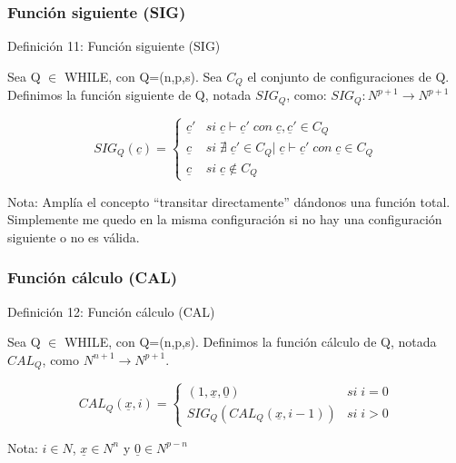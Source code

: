 \documentclass[xcolor=table]{beamer}
\begin{document}
\begin{frame}[fragile]\frametitle{ Función siguiente (SIG)  } \footnotesize  

\begin{block}{Definición 11: Función siguiente (SIG)}
\end{block}

Sea Q $\in$ WHILE, con Q=(n,p,s). Sea $C_Q$ el conjunto de configuraciones de Q. Definimos la función siguiente de Q, notada $SIG_Q$, como: $SIG_Q: N^{p+1} \rightarrow N^{p+1}$


   \scriptsize\begin{equation*} SIG_Q(\underline{c}) = 
            \begin{cases} 
                    \underline{c}'      & si\; \underline{c} \vdash  \underline{c}' \;con \;\underline{c}, \underline{c}' \in C_Q\\
                     \underline{c}      & si\; \nexists \; \underline{c}' \in C_Q |\; \underline{c} \vdash  \underline{c}' \;con \;\underline{c} \in C_Q \\
                     \underline{c}      & si\; \underline{c} \notin C_Q 
            \end{cases} \end{equation*}   

\scriptsize Nota: Amplía el concepto ``transitar directamente'' dándonos una función total. Simplemente me quedo en la misma configuración si no hay una configuración siguiente o no es válida.

\end{frame}

\begin{frame}[fragile]\frametitle{ Función cálculo (CAL) } \footnotesize  


\begin{block}{Definición 12: Función cálculo (CAL) }
\end{block}

Sea Q $\in$ WHILE, con Q=(n,p,s). Definimos la función cálculo de Q, notada $CAL_Q$, como $N^{n+1} \rightarrow N^{p+1}$.

 \scriptsize\begin{equation*} CAL_Q(\underline{x},i) = 
            \begin{cases} 
                    (1,\underline{x},\underline{0})      & si\; i=0 \\
                    SIG_Q (CAL_Q(\underline{x},i-1))      & si\; i>0 
            \end{cases} \end{equation*}   
            
\scriptsize Nota: $i \in N$, $\underline{x} \in N^n$ y $\underline{0} \in N^{p-n}$ 

\end{frame}
\end{document}
